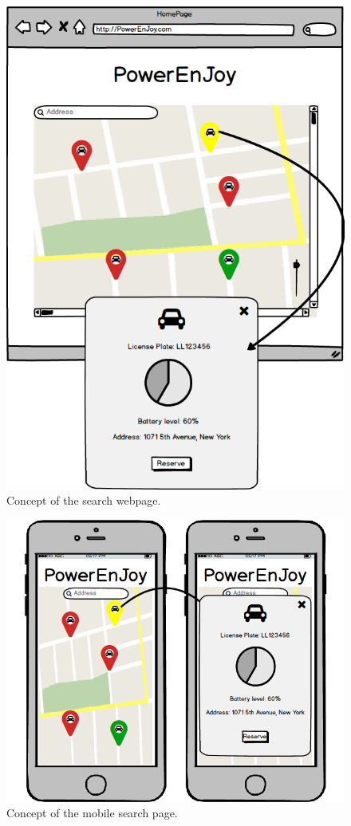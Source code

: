 \begin{figure}[H]
	\centering
	\includegraphics[width=\textwidth]{mockup/WebSearch.png}
	\caption{Concept of the search webpage.}
\end{figure}

\begin{figure}[H]
	\centering
	\includegraphics[width=\textwidth]{mockup/MobileSearch.png}
	\caption{Concept of the mobile search page.}
\end{figure}

